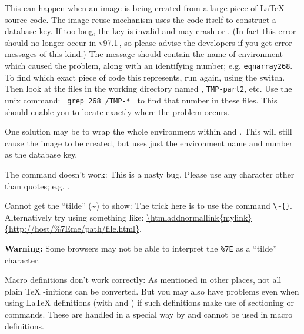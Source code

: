 \begin{htmllist}
\begin{changebar}
This can happen when an image is being created from a large piece
of \LaTeX{} source code. The image-reuse mechanism uses the code itself
to construct a database key. If too long, the key is invalid and may
crash  or . (In fact this error should no longer
occur in \textsc{v97.1}\,, so please advise the \latextohtml{} developers if
you get error messages of this kind.)\html{\\}
The message should contain the name of environment which caused the problem,
along with an identifying number; e.g. \texttt{eqnarray268}.
To find which exact piece of code this represents, run \latextohtml{}
again, using the  switch. Then look at the files
in the working directory named , \texttt{TMP-part2}, etc.
Use the unix  command: \texttt{ grep 268 }\texttt{/TMP-* }
to find that number in these files. 
This should enable you to locate exactly where the problem occurs.

One solution may be to wrap the whole environment within
 and .
This will still cause the image to be created, 
but uses just the environment name and number as the database key.
\end{changebar}%



\item [The \Lc{verb"ABC"} command doesn't work: ]
This is a nasty bug. Please use any character other than quotes; 
e.g. .

\item [Cannot get the ``tilde'' (\~{}) to show: \hfill]
The trick here is to use the command \verb|\~{}|.\html{\\} 
Alternatively try using something like:
\url{\htmladdnormallink{mylink}{http://host/\%7Eme/path/file.html}}. 

\textbf{Warning:} Some browsers may not be able to interpret the \verb|%7E|
as a ``tilde'' character.

\item [Macro definitions don't work correctly: ]
As mentioned in other places, not all plain \TeX{} -initions 
can be converted.
But you may also have problems even when using \LaTeX{} definitions
(with  and ) if such definitions
make use of sectioning or  commands. These are 
handled in a special way by \latextohtml{} and cannot be used in
macro definitions. 


\end{htmllist}
